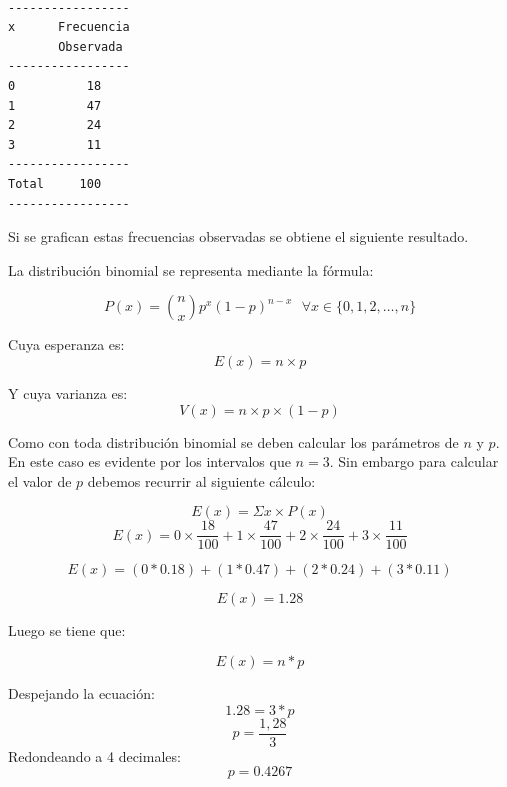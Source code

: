 \begin{verbatim}

-----------------
x      Frecuencia
       Observada
-----------------
0          18
1          47
2          24
3          11
-----------------
Total     100
-----------------
\end{verbatim}


Si se grafican estas frecuencias observadas se obtiene el siguiente resultado.

\begin{center}
\end{center}

La distribución binomial se representa mediante la fórmula:

$$P(x) = \binom{n}{x} p^x (1-p)^{n-x} \text{    }\forall x \in \{0,1,2,\dots, n\}$$

Cuya esperanza es:
$$E(x) = n\times p$$

Y cuya varianza es:
$$V(x) = n\times p \times (1-p)$$

Como con toda distribución binomial se deben calcular los parámetros de $n$ y $p$. En este caso es evidente por los intervalos que $n = 3$. Sin embargo para calcular el valor de $p$ debemos recurrir al siguiente cálculo:

$$E(x) = \Sigma x \times P(x)$$
$$E(x) = 0 \times \frac{18}{100} + 1 \times \frac{47}{100} + 2 \times \frac{24}{100}+ 3\times \frac{11}{100}$$

$$E(x) = (0 * 0.18) + (1 * 0.47) + (2 * 0.24) + (3 * 0.11)$$

$$E(x) = 1.28$$

Luego se tiene que:

$$E(x) = n * p$$

Despejando la ecuación:
$$1.28 = 3 * p$$
$$p = \frac{1,28}{3}$$
Redondeando a 4 decimales:
$$p = 0.4267$$

